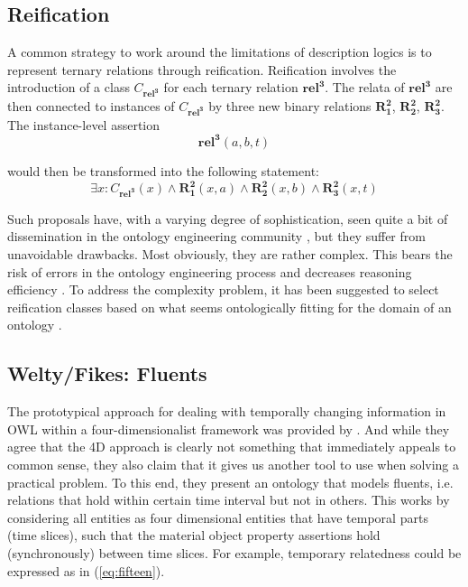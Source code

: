 \documentclass[10pt]{bmc_article}
\newcommand{\mirel}[1]{\ensuremath{\mathrm{\mathbf{#1}}}}
\newcommand{\mclass}[1]{\ensuremath{\mathit{#1}}}
\newcommand{\mrel}[2]{\mirel{#1^#2}}
\newcommand{\mrelb}[1]{\mrel{#1}{2}}
\newcommand{\mrelt}[1]{\mrel{#1}{3}}
\newenvironment{bmcformat}{\baselineskip20pt\sloppy\setboolean{publ}{false}}{\baselineskip20pt\sloppy}
\begin{document}
\begin{bmcformat}
\subsection*{Reification}

A common strategy to work around the limitations of description logics is to
represent ternary relations through reification. Reification involves the
introduction of a class $\mclass{C_\mrelt{rel}}$ for each ternary relation
\mrelt{rel}. The relata of \mrelt{rel}
are then connected to instances of $\mclass{C_\mrelt{rel}}$ by three new binary
relations \mrelb{R_1}, \mrelb{R_2},
\mrelb{R_3}. The instance-level assertion
$$
\mrelt{rel}(a,b,t)
$$

would then be transformed into the following statement:
\begin{equation}
\exists x: \mclass{C_\mrelt{rel}}(x) \wedge
\mrelb{R_1}(x,a) \wedge
\mrelb{R_2}(x,b) \wedge
\mrelb{R_3}(x,t) 
\end{equation}

Such proposals have, with a varying degree of sophistication, seen quite a bit
of dissemination in the ontology engineering community \cite{ODP:nary}, but they suffer
from unavoidable drawbacks. Most obviously, they are rather complex. This bears
the risk of errors in the ontology engineering process and decreases reasoning
efficiency \cite{Grewe:2010}. To address the complexity problem, it has been suggested to
select reification classes based on what seems ontologically fitting for the
domain of an ontology \cite{Fiadeiro:2010}.

\subsection*{Welty/Fikes: Fluents}
The prototypical approach for dealing with temporally changing information in
OWL within a four-dimensionalist framework was provided by 
\cite{Welty:2006}. And while they agree that the 4D  approach is clearly 
not something that immediately appeals to common sense, they also claim
that it gives us another tool to use when solving a practical problem. To this
end, they present an ontology that models fluents, i.e. relations that hold
within certain time interval but not in others. This works by considering all
entities as four dimensional entities that have temporal parts (time slices),
such that the material object property assertions hold (synchronously) between
time slices. For example, temporary relatedness could be expressed as in
(\ref{eq:fifteen}).


\end{bmcformat}
\end{document}
